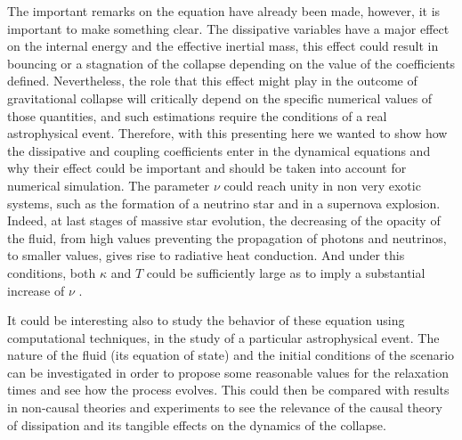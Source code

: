 The important remarks on the equation have already been made, however, it is important to make something clear. The dissipative variables have a major effect on the internal energy and the effective inertial mass, this effect could result in bouncing or a stagnation of the collapse depending on the value of the coefficients defined. Nevertheless, the role that this effect might play in the outcome of gravitational collapse will critically depend on the specific numerical values of those quantities, and such estimations require the conditions of a real astrophysical event. Therefore, with this presenting here we wanted to show how the dissipative and coupling coefficients enter in the dynamical equations and why their effect could be important and should be taken into account for numerical simulation. The parameter $\nu$ could reach unity in non very exotic systems, such as the formation of a neutrino star and in a supernova explosion. Indeed, at last stages of massive star evolution, the decreasing of the opacity of the fluid, from high values preventing the propagation of photons and neutrinos, to smaller values, gives rise to radiative heat conduction. And under this conditions, both $\kappa$ and $T$ could be sufficiently large as to imply a substantial increase of $\nu$ \cite{herrera2009relativistic}. 

It could be interesting also to study the behavior of these equation using computational techniques, in the study of a particular astrophysical event. The nature of the fluid (its equation of state) and the initial conditions of the scenario can be investigated in order to propose some reasonable values for the relaxation times and see how the process evolves. This could then be compared with results in non-causal theories and experiments to see the relevance of the causal theory of dissipation and its tangible effects on the dynamics of the collapse.